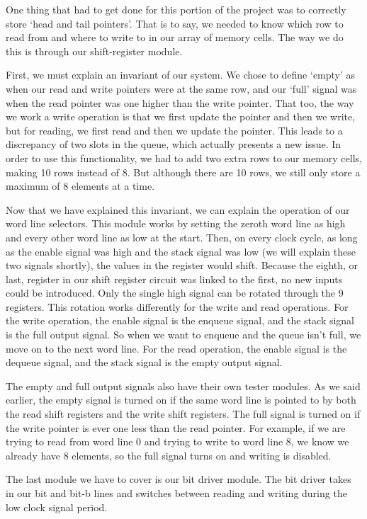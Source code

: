 \documentclass[11pt]{article}
\theoremstyle{definition}
\begin{document}
\begin{enumerate}
One thing that had to get done for this portion of the project was to correctly store `head and tail pointers'. That is to say, we needed to know which row to read from and where to write to in our array of memory cells. The way we do this is through our shift-register module. 

First, we must explain an invariant of our system. We chose to define `empty' as when our read and write pointers were at the same row, and our `full' signal was when the read pointer was one higher than the write pointer. That too, the way we work a write operation is that we first update the pointer and then we write, but for reading, we first read and then we update the pointer. This leads to a discrepancy of two slots in the queue, which actually presents a new issue. In order to use this functionality, we had to add two extra rows to our memory cells, making 10 rows instead of 8. But although there are 10 rows, we still only store a maximum of 8 elements at a time.

Now that we have explained this invariant, we can explain the operation of our word line selectors. This module works by setting the zeroth word line as high and every other word line as low at the start. Then, on every clock cycle, as long as the enable signal was high and the stack signal was low (we will explain these two signals shortly), the values in the register would shift. Because the eighth, or last, register in our shift register circuit was linked to the first, no new inputs could be introduced. Only the single high signal can be rotated through the 9 registers. This rotation works differently for the write and read operations. For the write operation, the enable signal is the enqueue signal, and the stack signal is the full output signal. So when we want to enqueue and the queue isn't full, we move on to the next word line. For the read operation, the enable signal is the dequeue signal, and the stack signal is the empty output signal. 

The empty and full output signals also have their own tester modules. As we said earlier, the empty signal is turned on if the same word line is pointed to by both the read shift registers and the write shift registers. The full signal is turned on if the write pointer is ever one less than the read pointer. For example, if we are trying to read from word line 0 and trying to write to word line 8, we know we already have 8 elements, so the full signal turns on and writing is disabled. 

The last module we have to cover is our bit driver module. The bit driver takes in our bit and bit-b lines and switches between reading and writing during the low clock signal period. 


\end{enumerate}
\end{document}
